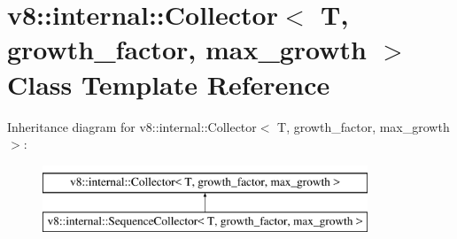 \hypertarget{classv8_1_1internal_1_1Collector}{}\section{v8\+:\+:internal\+:\+:Collector$<$ T, growth\+\_\+factor, max\+\_\+growth $>$ Class Template Reference}
\label{classv8_1_1internal_1_1Collector}
Inheritance diagram for v8\+:\+:internal\+:\+:Collector$<$ T, growth\+\_\+factor, max\+\_\+growth $>$\+:\begin{figure}[H]
\begin{center}
\leavevmode
\includegraphics[height=2.000000cm]{classv8_1_1internal_1_1Collector}
\end{center}
\end{figure}
